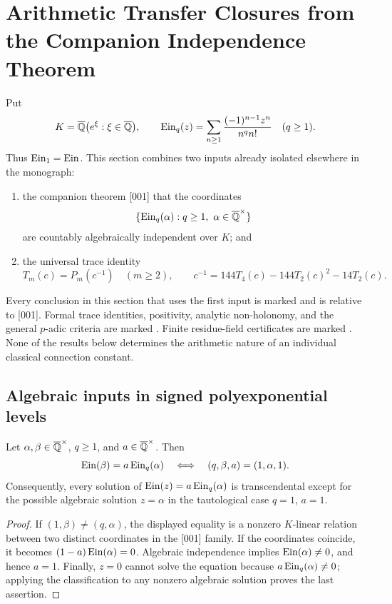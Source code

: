\section{Arithmetic Transfer Closures from the Companion Independence Theorem}
\label{sec:transfer-closures}

Put
\[
 K=\overline{\mathbb Q}\bigl(e^\xi:\xi\in\overline{\mathbb Q}\bigr),
 \qquad
 \operatorname{Ein}_q(z)=\sum_{n\ge1}\frac{(-1)^{n-1}z^n}{n^q n!}
 \quad(q\ge1).
\]
Thus \(\operatorname{Ein}_1=\operatorname{Ein}\).  This section combines two inputs already isolated
elsewhere in the monograph:

\begin{enumerate}
\item the companion theorem [001] that the coordinates
\[
 \{\Ein_q(\alpha):q\ge1,\ \alpha\in\Qbar^\times\}
\]
are countably algebraically independent over \(K\); and
\item the universal trace identity
\[
 T_m(c)=P_m(c^{-1})\quad(m\ge2),
 \qquad
 c^{-1}=144T_4(c)-144T_2(c)^2-14T_2(c).
\]
\end{enumerate}

\begin{statusbox}
Every conclusion in this section that uses the first input is marked
\RPASS{} and is relative to [001].  Formal trace identities, positivity,
analytic non-holonomy, and the general \(p\)-adic criteria are marked
\UPASS{}.  Finite residue-field certificates are marked \XPASS{}.  None of
the results below determines the arithmetic nature of an individual
classical connection constant.
\end{statusbox}

\subsection{Algebraic inputs in signed polyexponential levels}

\begin{theorem}
\label{thm:transfer-signed-classification}
Let \(\alpha,\beta\in\overline{\mathbb Q}^\times\), \(q\ge1\), and
\(a\in\overline{\mathbb Q}^\times\).  Then
\[
 \operatorname{Ein}(\beta)=a\operatorname{Ein}_q(\alpha)
 \quad\Longleftrightarrow\quad
 (q,\beta,a)=(1,\alpha,1).
\]
Consequently, every solution of
\(\operatorname{Ein}(z)=a\operatorname{Ein}_q(\alpha)\) is transcendental except for the possible
algebraic solution \(z=\alpha\) in the tautological case \(q=1\), \(a=1\).
\end{theorem}

\begin{proof}
If \((1,\beta)\ne(q,\alpha)\), the displayed equality is a nonzero
\(K\)-linear relation between two distinct coordinates in the [001]
family.  If the coordinates coincide, it becomes
\((1-a)\operatorname{Ein}(\alpha)=0\).  Algebraic independence implies
\(\operatorname{Ein}(\alpha)\ne0\), and hence \(a=1\).  Finally, \(z=0\) cannot solve
the equation because \(a\operatorname{Ein}_q(\alpha)\ne0\); applying the classification
to any nonzero algebraic solution proves the last assertion.
\end{proof}


